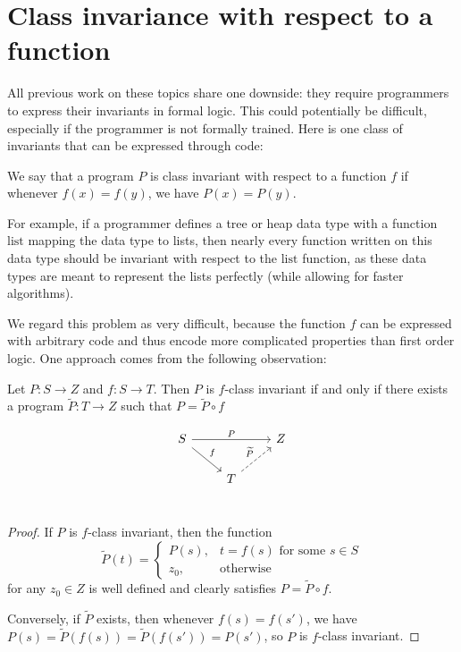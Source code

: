 \documentclass{llncs}
\begin{document}
  \section{Class invariance with respect to a function}

  All previous work on these topics share one downside: they require programmers
  to express their invariants in formal logic. 
  This could potentially be difficult,
  especially if the programmer is not formally trained.
  Here is one class of invariants that can be expressed through code:

  \begin{definition} We say that a program $P$ is class invariant with respect to a
    function $f$ if whenever $f(x)=f(y)$, we have $P(x)=P(y)$.
  \end{definition}

  For example, if a programmer defines a tree or heap data type with a function
  $\mathrm{list}$ mapping the data type to lists,
  then nearly every function written on this data type should be invariant with
  respect to the $\mathrm{list}$ function,
  as these data types are meant to represent the lists perfectly (while allowing
  for faster algorithms).

  We regard this problem as very difficult, because the function $f$ can be
  expressed with arbitrary code and thus encode more complicated properties than
  first order logic. One approach comes from the following observation:

  \begin{lemma} Let $P : S \to Z$ and $f : S \to T$.
    Then $P$ is $f$-class invariant if and only if
    there exists a program $\widetilde{P} : T\to Z$
    such that $P = \widetilde{P} \circ f$
  \end{lemma}
    \[
      \begin{tikzcd}
        S \arrow{rr}{P} \arrow{rd}{f} &   & Z \\
        & T \arrow[dashed]{ru}{\widetilde{P}} &   \\
      \end{tikzcd}
    \]
    \vspace{-0.3in}
  \begin{proof}
    If $P$ is $f$-class invariant, then the function
    \[ \widetilde{P}(t) = \begin{cases}
         P(s), & t = f(s) \text{ for some $s\in S$} \\
         z_0, & \text{otherwise}
       \end{cases}
    \]
    for any $z_0 \in Z$
    is well defined and clearly satisfies $P = \widetilde{P} \circ f$.

    Conversely, if $\widetilde{P}$ exists, then whenever $f(s)=f(s')$,
    we have $P(s) = \widetilde{P}(f(s)) = \widetilde{P}(f(s')) = P(s')$,
    so $P$ is $f$-class invariant.
  \end{proof}
\end{document}
